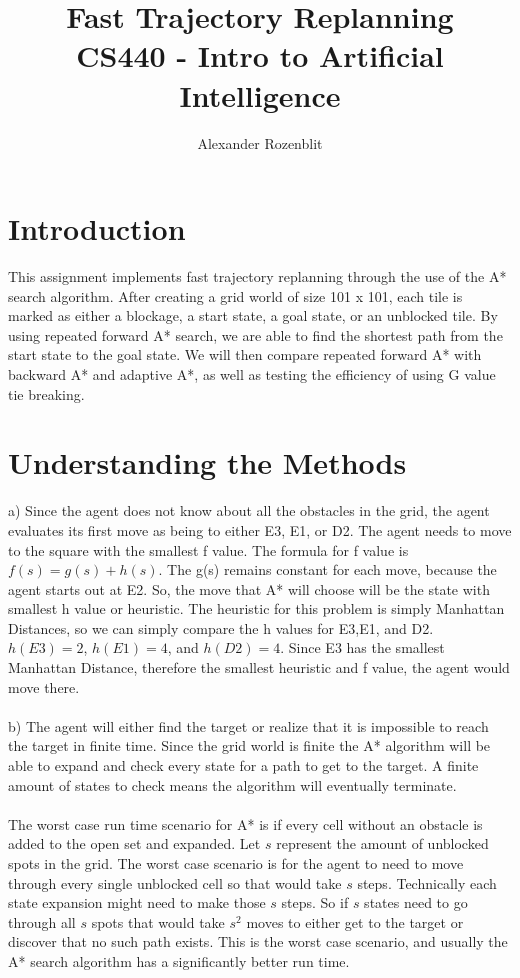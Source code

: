 \documentclass[12pt]{article}
\begin{document}
\title{%
  Fast Trajectory Replanning \\
  \large CS440 - Intro to Artificial Intelligence}

\author{Alexander Rozenblit}


\maketitle

\section{Introduction}
This assignment implements fast trajectory replanning through the use of the A* search algorithm. After creating a grid world of size 101 x 101, each tile is marked as either a blockage, a start state, a goal state, or an unblocked tile. By using repeated forward A* search, we are able to find the shortest path from the start state to the goal state. We will then compare repeated forward A* with backward A* and adaptive A*, as well as testing the efficiency of using G value tie breaking.

\section{Understanding the Methods}
a) Since the agent does not know about all the obstacles in the grid, the agent evaluates its first move as being to either E3, E1, or D2. The agent needs to move to the square with the smallest f value. The formula for f value is $f(s) = g(s) + h(s)$. The g(s) remains constant for each move, because the agent starts out at E2. So, the move that A* will choose will be the state with smallest h value or heuristic. The heuristic for this problem is simply Manhattan Distances, so we can simply compare the h values for E3,E1, and D2. $h(E3) = 2$, $h(E1) = 4$, and $h(D2) = 4$. Since E3 has the smallest Manhattan Distance, therefore the smallest heuristic and f value, the agent would move there.  \\
\\
b)  The agent will either find the target or realize that it is impossible to reach the target in finite time. Since the grid world is finite the A* algorithm will be able to expand and check every state for a path to get to the target. A finite amount of states to check means the algorithm will eventually terminate.\\
\\
The worst case run time scenario for A* is if every cell without an obstacle is added to the open set and expanded. Let $s$ represent the amount of unblocked spots in the grid. The worst case scenario is for the agent to need to move through every single unblocked cell so that would take $s$ steps. Technically each state expansion might need to make those $s$ steps. So if $s$ states need to go through all $s$ spots that would take $s^{2}$ moves to either get to the target or discover that no such path exists. This is the worst case scenario, and usually the A* search algorithm has a significantly better run time.\\
\end{document}
